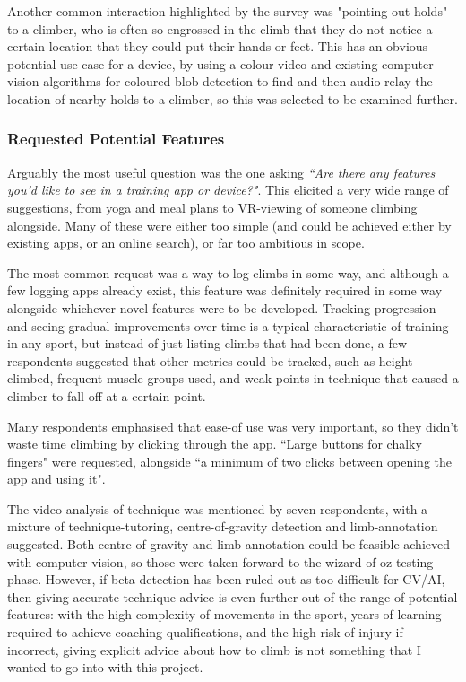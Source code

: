 Another common interaction highlighted by the survey was "pointing out holds" to a climber, who is often so engrossed in the climb that they do not notice a certain location that they could put their hands or feet.
This has an obvious potential use-case for a device, by using a colour video and existing computer-vision algorithms for coloured-blob-detection to find and then audio-relay the location of nearby holds to a climber, so this was selected to be examined further.



\subsubsection{Requested Potential Features}
Arguably the most useful question was the one asking
\textit{``Are there any features you'd like to see in a training app or device?"}.
This elicited a very wide range of suggestions, from yoga and meal plans to VR-viewing of someone climbing alongside.
Many of these were either too simple (and could be achieved either by existing apps, or an online search), or far too ambitious in scope.

The most common request was a way to log climbs in some way, and although a few logging apps already exist, this feature was definitely required in some way alongside whichever novel features were to be developed.
Tracking progression and seeing gradual improvements over time is a typical characteristic of training in any sport, but instead of just listing climbs that had been done, a few respondents suggested that other metrics could be tracked, such as height climbed, frequent muscle groups used, and weak-points in technique that caused a climber to fall off at a certain point.


Many respondents emphasised that ease-of use was very important, so they didn't waste time climbing by clicking through the app. ``Large buttons for chalky fingers" were requested, alongside ``a minimum of two clicks between opening the app and using it".

The video-analysis of technique was mentioned by seven respondents, with a mixture of technique-tutoring, centre-of-gravity detection and limb-annotation suggested.
Both centre-of-gravity and limb-annotation could be feasible achieved with computer-vision, so those were taken forward to the wizard-of-oz testing phase.
However, if beta-detection has been ruled out as too difficult for CV/AI, then giving accurate technique advice is even further out of the range of potential features: with the high complexity of movements in the sport, years of learning required to achieve coaching qualifications, and the high risk of injury if incorrect, giving explicit advice about how to climb is not something that I wanted to go into with this project.


